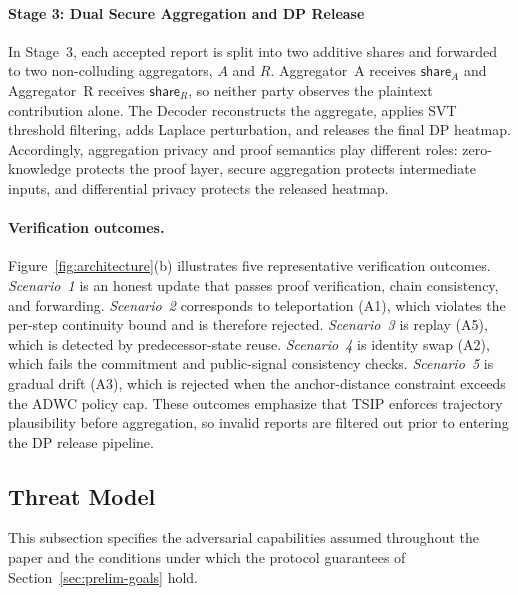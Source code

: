 \documentclass[conference]{IEEEtran}
\theoremstyle{definition}
\theoremstyle{plain}
\begin{document}
\paragraph{Stage 3: Dual Secure Aggregation and DP Release}
In Stage~3, each accepted report is split into two additive shares and
forwarded to two non-colluding aggregators, $A$ and $R$.
Aggregator~A receives $\mathsf{share}_A$ and Aggregator~R receives
$\mathsf{share}_R$, so neither party observes the plaintext
contribution alone.
The Decoder reconstructs the aggregate, applies SVT threshold filtering,
adds Laplace perturbation, and releases the final DP heatmap.
Accordingly, aggregation privacy and proof semantics play different
roles: zero-knowledge protects the proof layer, secure aggregation
protects intermediate inputs, and differential privacy protects the
released heatmap.
\paragraph{Verification outcomes.}
Figure~\ref{fig:architecture}(b) illustrates five representative
verification outcomes.
\emph{Scenario~1} is an honest update that passes proof verification,
chain consistency, and forwarding.
\emph{Scenario~2} corresponds to teleportation (A1), which violates the
per-step continuity bound and is therefore rejected.
\emph{Scenario~3} is replay (A5), which is detected by predecessor-state
reuse.
\emph{Scenario~4} is identity swap (A2), which fails the commitment and
public-signal consistency checks.
\emph{Scenario~5} is gradual drift (A3), which is rejected when the
anchor-distance constraint exceeds the ADWC policy cap.
These outcomes emphasize that \textsc{TSIP} enforces trajectory
plausibility before aggregation, so invalid reports are filtered out
prior to entering the DP release pipeline.
\subsection{Threat Model}\label{sec:threat}

This subsection specifies the adversarial capabilities assumed
throughout the paper and the conditions under which the protocol
guarantees of Section~\ref{sec:prelim-goals} hold.
\end{document}
